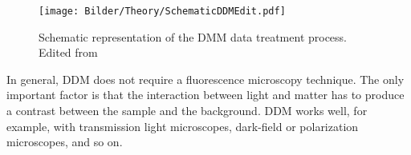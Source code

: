 \begin{figure}[ht]
    \centering
    \texttt{[image: Bilder/Theory/SchematicDDMEdit.pdf]}
    \caption{Schematic representation of the DMM data treatment process. Edited from~\cite{Struntz.2017}}
    \label{fig:DataTreatDDM}
\end{figure}

In general, DDM does not require a fluorescence microscopy technique. The only 
important factor is that the interaction between light and matter has to produce a
contrast between the sample and the background. DDM works well, for example, with transmission light 
microscopes, dark-field or polarization microscopes, and so on.